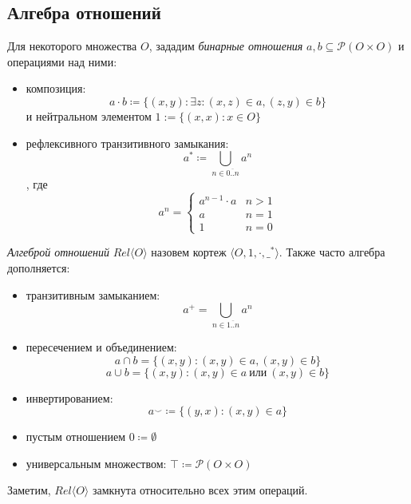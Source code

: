 \documentclass[times
              ]{itmo-student-thesis}
\begin{document}
    \subsection{Алгебра отношений}
      Для некоторого множества $ O $, зададим \textit{бинарные отношения}
      $ a, b \subseteq \mathcal{P}(O \times O) $
      и операциями над ними:
      \begin{itemize}
        \item композиция:
         $$a \cdot b \coloneqq
        \{ (x, y) : \exists z : (x, z) \in a, (z, y) \in b \} $$
        и нейтральном элементом $ 1 := \{(x, x) : x \in O\}$
        \item рефлексивного транзитивного замыкания:
        $$ a^* \coloneqq \bigcup\limits_{n \in \overline{0..n}} a^n $$,
       где
       \begin{equation*}
        a^n = \begin{cases}
          a^{n-1} \cdot a & n > 1\\
          a               & n = 1\\
          1               & n = 0
        \end{cases}
       \end{equation*}
      \end{itemize}

      \textit{Алгеброй отношений} $\mathit{Rel}\langle O \rangle$
      назовем кортеж  $\langle O, 1, \cdot, \_^* \rangle $.
      Также часто алгебра дополняется:
      \begin{itemize}
        \item транзитивным замыканием:
        $$ a^+ = \bigcup\limits_{n \in \overline{1..n}} a^n $$
        \item пересечением и объединением:
        $$ a \cap b = \{(x, y) : (x, y) \in a, (x, y) \in b \} $$
        $$ a \cup b = \{(x, y) : (x, y) \in a ~\text{или}~ (x, y) \in b   \} $$
        \item инвертированием:
         $$ a^\smile \coloneqq \{ (y, x): (x, y) \in a \} $$
        \item пустым отношением $ 0 \coloneqq \emptyset $
        \item универсальным множеством: $ \top \coloneqq \mathcal{P}(O \times O) $
      \end{itemize}

      Заметим, $ \mathit{Rel} \langle O \rangle $ замкнута относительно всех этим операций.
\end{document}
